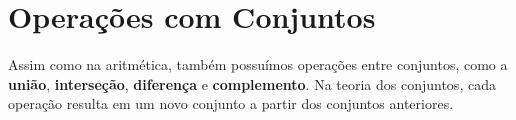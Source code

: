 \section{Operações com Conjuntos}
\label{sec:operacoes-com-conjuntos}

Assim como na aritmética, também possuímos operações entre conjuntos, como a \textbf{união}, \textbf{interseção}, \textbf{diferença} e \textbf{complemento}. Na teoria dos conjuntos, cada operação resulta em um novo conjunto a partir dos conjuntos anteriores.

